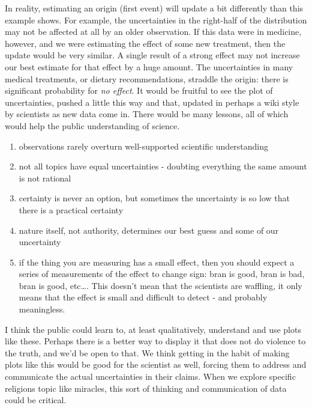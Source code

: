 \documentclass{tufte-book}
\begin{document}
In reality, estimating an origin (first event) will update a bit
differently than this example shows. For example, the uncertainties in
the right-half of the distribution may not be affected at all by an
older observation. If this data were in medicine, however, and we were
estimating the effect of some new treatment, then the update would be
very similar. A single result of a strong effect may not increase our
best estimate for that effect by a huge amount. The uncertainties in
many medical treatments, or dietary recommendations, straddle the
origin: there is significant probability for \emph{no effect}. It would
be fruitful to see the plot of uncertainties, pushed a little this way
and that, updated in perhaps a wiki style by scientists as new data come
in. There would be many lessons, all of which would help the public
understanding of science.

\begin{enumerate}
\def\labelenumi{\arabic{enumi}.}
\itemsep1pt\parskip0pt
\item
  observations rarely overturn well-supported scientific understanding
\item
  not all topics have equal uncertainties - doubting everything the same
  amount is not rational
\item
  certainty is never an option, but sometimes the uncertainty is so low
  that there is a practical certainty
\item
  nature itself, not authority, determines our best guess and some of
  our uncertainty
\item
  if the thing you are measuring has a small effect, then you should
  expect a series of measurements of the effect to change sign: bran is
  good, bran is bad, bran is good, etc\ldots{}. This doesn't mean that
  the scientists are waffling, it only means that the effect is small
  and difficult to detect - and probably meaningless.
\end{enumerate}

I think the public could learn to, at least qualitatively, understand
and use plots like these. Perhaps there is a better way to display it
that does not do violence to the truth, and we'd be open to that. We
think getting in the habit of making plots like this would be good for
the scientist as well, forcing them to address and communicate the
actual uncertainties in their claims. When we explore specific religions
topic like miracles, this sort of thinking and communication of data
could be critical.
\end{document}
